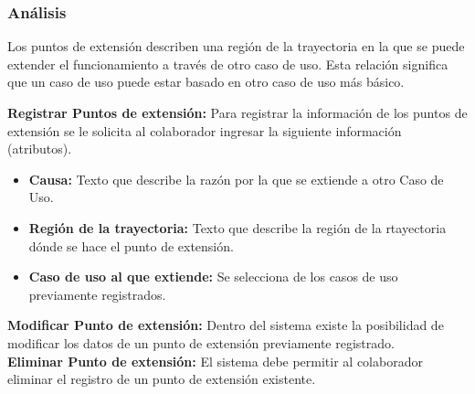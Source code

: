 \subsubsection {Análisis}
Los puntos de extensión describen una región de la trayectoria en la que se puede extender el funcionamiento a través de otro caso de uso. Esta relación significa que un caso de uso puede estar basado en otro caso de uso más básico.

\textbf {Registrar Puntos de extensión:}
Para registrar la información de los puntos de extensión se le solicita al colaborador ingresar la siguiente información (atributos).
\begin{itemize}
	\item \textbf{Causa:} Texto que describe la razón por la que se extiende a otro Caso de Uso.
	\item \textbf{Región de la trayectoria:} Texto que describe la región de la rtayectoria dónde se hace el punto de extensión.
	\item \textbf{Caso de uso al que extiende:} Se selecciona de los casos de uso previamente registrados.
\end{itemize}

\textbf {Modificar Punto de extensión:}
Dentro del sistema existe la posibilidad de modificar los datos de un punto de extensión previamente registrado.\\

\textbf {Eliminar Punto de extensión:} 
El sistema debe permitir al colaborador eliminar el registro de un punto de extensión existente.\\
